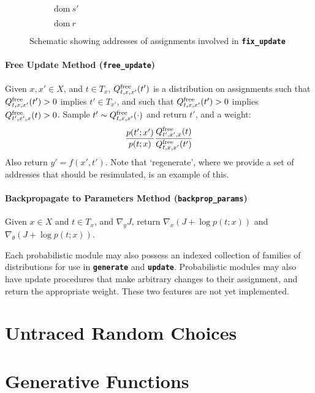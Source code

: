 \documentclass{article}
\newcommand{\code}[1]{\texttt{\small{\textbf{#1}}}}
\newcommand{\dom}[1]{\mbox{dom}{~#1}}
\newcommand{\free}[0]{\mbox{\scriptsize free}}
\newcommand{\innerll}[0]{(0.25 + 0.625, 0.625)}
\newcommand{\innerlr}[0]{(0.25 + 0.625 + 0.5, 0.625)}
\newcommand{\innerur}[0]{(0.25 + 0.625 + 0.5, 0.625 + 0.5)}
\newcommand{\innerul}[0]{(0.25 + 0.625, 0.625 + 0.5)}
\newcommand{\outerll}[0]{(0.25, 0)}
\newcommand{\outerlr}[0]{(0.25 + 1.75, 0)}
\newcommand{\outerur}[0]{(0.25 + 1.75, 1.75)}
\newcommand{\outerul}[0]{(0.25, 1.75)}
\newcommand{\all}[0]{(0, 0)}
\newcommand{\aur}[0]{(2, 2)}
\newcommand{\bll}[0]{(0.25, -0.25)}
\newcommand{\bur}[0]{(2.25, 1.75)}
\begin{document}
\begin{figure}[t]
\begin{subfigure}[b]{0.3\textwidth}
\caption{$\dom{s'}$}
\end{subfigure}%
\begin{subfigure}[b]{0.3\textwidth}
\centering
{}
\caption{$\dom{r}$}
\end{subfigure}
\caption{Schematic showing addresses of assignments involved in \code{fix\_update}}
\end{figure}



\paragraph{Free Update Method (\code{free\_update})}
Given $x, x' \in X$, and $t \in T_x$, $Q^{\free}_{t,x,x'}(t')$ is a distribution on assignments such that $Q^{\free}_{t,x,x'}(t') > 0$ implies $t' \in T_{x'}$, and such that $Q^{\free}_{t,x,x'}(t') > 0$ implies $Q^{\free}_{t',x',x}(t) > 0$.
Sample $t' \sim Q^{\free}_{t,x,x'}(\cdot)$ and return $t'$, and a weight:
\[
    \frac{p(t'; x')}{p(t; x)} \frac{Q^{\free}_{t',x',x}(t)}{Q^{\free}_{t,x,x'}(t')}
\]
Also return $y' = f(x', t')$.
Note that `regenerate', where we provide a set of addresses that should be resimulated, is an example of this.

\paragraph{Backpropagate to Parameters Method (\code{backprop\_params})}
Given $x \in X$ and $t \in T_x$, and $\nabla_y J$, return $\nabla_x (J + \log p(t; x))$ and $\nabla_{\theta} (J + \log p(t; x))$.


Each probabilistic module may also possess an indexed collection of families of distributions for use in \code{generate} and \code{update}.
Probabilistic modules may also have update procedures that make arbitrary changes to their assignment, and return the appropriate weight.
These two features are not yet implemented.

\section{Untraced Random Choices}

\section{Generative Functions}

\clearpage


\end{document}
